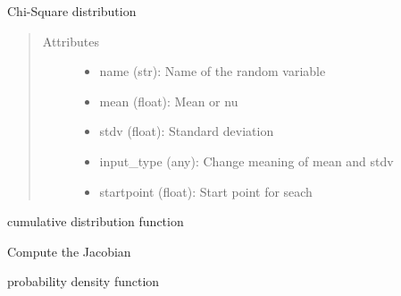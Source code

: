 \documentclass[letterpaper,10pt,english]{sphinxmanual}
\begin{document}
\begin{fulllineitems}
Chi-Square distribution
\begin{quote}\begin{description}
\item[{Attributes }] \leavevmode\begin{itemize}
\item {} 
name (str):   Name of the random variable

\item {} 
mean (float): Mean or nu

\item {} 
stdv (float): Standard deviation

\item {} 
input\_type (any): Change meaning of mean and stdv

\item {} 
startpoint (float): Start point for seach

\end{itemize}

\end{description}\end{quote}


\begin{fulllineitems}
cumulative distribution function

\end{fulllineitems}



\begin{fulllineitems}
Compute the Jacobian

\end{fulllineitems}



\begin{fulllineitems}
probability density function

\end{fulllineitems}




\end{fulllineitems}
\end{document}
